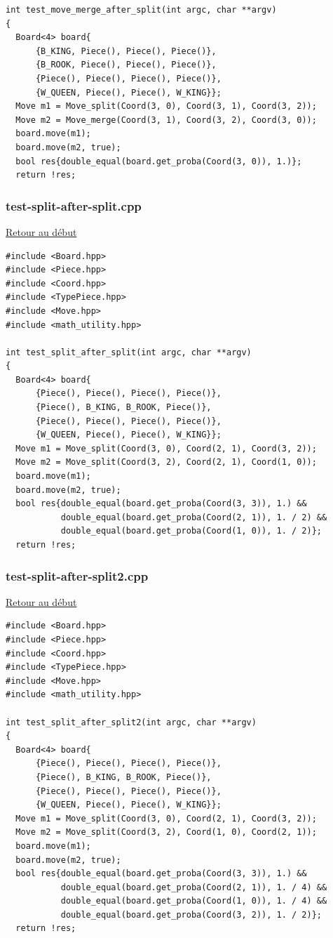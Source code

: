 {\begin{frame}[fragile]
\begin{verbatim}
int test_move_merge_after_split(int argc, char **argv)
{
  Board<4> board{
      {B_KING, Piece(), Piece(), Piece()},
      {B_ROOK, Piece(), Piece(), Piece()},
      {Piece(), Piece(), Piece(), Piece()},
      {W_QUEEN, Piece(), Piece(), W_KING}};
  Move m1 = Move_split(Coord(3, 0), Coord(3, 1), Coord(3, 2));
  Move m2 = Move_merge(Coord(3, 1), Coord(3, 2), Coord(3, 0));
  board.move(m1);
  board.move(m2, true);
  bool res{double_equal(board.get_proba(Coord(3, 0)), 1.)};
  return !res;

\end{verbatim}
\end{frame}

\begin{frame}[fragile]
\label{testsplitaftersplit.cpp}
\frametitle{test-split-after-split.cpp}
\hyperlink{conclusion}{Retour au début}\newline
\begin{verbatim}
#include <Board.hpp>
#include <Piece.hpp>
#include <Coord.hpp>
#include <TypePiece.hpp>
#include <Move.hpp>
#include <math_utility.hpp>

int test_split_after_split(int argc, char **argv)
{
  Board<4> board{
      {Piece(), Piece(), Piece(), Piece()},
      {Piece(), B_KING, B_ROOK, Piece()},
      {Piece(), Piece(), Piece(), Piece()},
      {W_QUEEN, Piece(), Piece(), W_KING}};
  Move m1 = Move_split(Coord(3, 0), Coord(2, 1), Coord(3, 2));
  Move m2 = Move_split(Coord(3, 2), Coord(2, 1), Coord(1, 0));
  board.move(m1);
  board.move(m2, true);
  bool res{double_equal(board.get_proba(Coord(3, 3)), 1.) &&
           double_equal(board.get_proba(Coord(2, 1)), 1. / 2) &&
           double_equal(board.get_proba(Coord(1, 0)), 1. / 2)};
  return !res;

\end{verbatim}
\end{frame}

\begin{frame}[fragile]
\label{testsplitaftersplit2.cpp}
\frametitle{test-split-after-split2.cpp}
\hyperlink{conclusion}{Retour au début}\newline
\begin{verbatim}
#include <Board.hpp>
#include <Piece.hpp>
#include <Coord.hpp>
#include <TypePiece.hpp>
#include <Move.hpp>
#include <math_utility.hpp>

int test_split_after_split2(int argc, char **argv)
{
  Board<4> board{
      {Piece(), Piece(), Piece(), Piece()},
      {Piece(), B_KING, B_ROOK, Piece()},
      {Piece(), Piece(), Piece(), Piece()},
      {W_QUEEN, Piece(), Piece(), W_KING}};
  Move m1 = Move_split(Coord(3, 0), Coord(2, 1), Coord(3, 2));
  Move m2 = Move_split(Coord(3, 2), Coord(1, 0), Coord(2, 1));
  board.move(m1);
  board.move(m2, true);
  bool res{double_equal(board.get_proba(Coord(3, 3)), 1.) &&
           double_equal(board.get_proba(Coord(2, 1)), 1. / 4) &&
           double_equal(board.get_proba(Coord(1, 0)), 1. / 4) &&
           double_equal(board.get_proba(Coord(3, 2)), 1. / 2)};
  return !res;


\end{verbatim}
\end{frame}}

